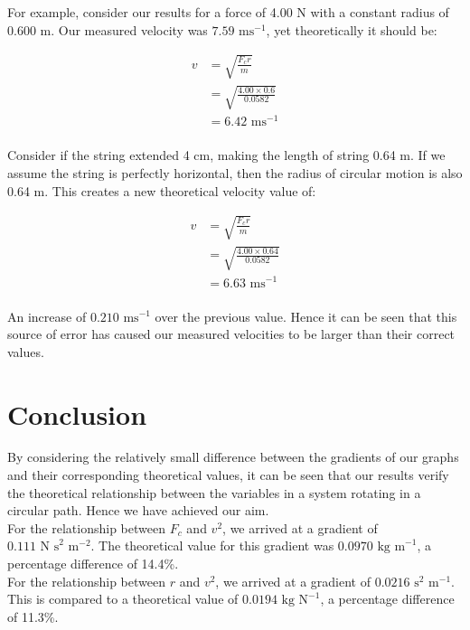 \documentclass[a4paper,11pt]{article}
\begin{document}
For example, consider our results for a force of 4.00 N with a constant radius
of 0.600 m. Our measured velocity was $7.59\mbox{ ms}^{-1}$, yet theoretically
it should be:

\begin{align*}
	v & = \sqrt{\frac{F_c r}{m}} \\
	  & = \sqrt{\frac{4.00 \times 0.6}{0.0582}} \\
	  & = 6.42\mbox{ ms}^{-1} \\
\end{align*}

Consider if the string extended 4 cm, making the length of string 0.64 m. If we
assume the string is perfectly horizontal, then the radius of circular motion
is also 0.64 m. This creates a new theoretical velocity value of:

\begin{align*}
	v & = \sqrt{\frac{F_c r}{m}} \\
	  & = \sqrt{\frac{4.00 \times 0.64}{0.0582}} \\
	  & = 6.63\mbox{ ms}^{-1} \\
\end{align*}

An increase of $0.210\mbox{ ms}^{-1}$ over the previous value. Hence it can be
seen that this source of error has caused our measured velocities to be larger
than their correct values.


\section{Conclusion}

By considering the relatively small difference between the gradients of our graphs and their
corresponding theoretical values, it can be seen that our results verify the theoretical
relationship between the variables in a system rotating in a circular path.
Hence we have achieved our aim. \\

For the relationship between $F_c$ and $v^2$, we arrived at a gradient of
$0.111\mbox{ N s}^{2}\mbox{ m}^{-2}$. The theoretical value for this gradient
was $0.0970\mbox{ kg m}^{-1}$, a percentage difference of 14.4\%. \\

For the relationship between $r$ and $v^2$, we arrived at a gradient of
$0.0216\mbox{ s}^{2}\mbox{ m}^{-1}$. This is compared to a theoretical value of
$0.0194\mbox{ kg N}^{-1}$, a percentage difference of 11.3\%.
\end{document}
